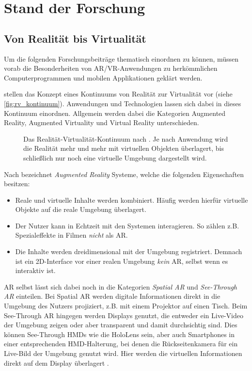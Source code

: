 \chapter{Stand der Forschung}
\label{chap:related_work}

\section{Von Realität bis Virtualität}
Um die folgenden Forschungsbeiträge thematisch einordnen zu können, müssen vorab die Besonderheiten von AR/VR-Anwendungen zu herkömmlichen Computerprogrammen und mobilen Applikationen geklärt werden.

\textcite{Milgram1994} stellen das Konzept eines Kontinuums von Realität zur Virtualität vor (siehe \autoref{fig:rv_kontinuum}).
Anwendungen und Technologien lassen sich dabei in dieses Kontinuum einordnen.
Allgemein werden dabei die Kategorien Augmented Reality, Augmented Virtuality und Virtual Reality unterschieden.
\begin{figure}[b]
    \centering
    \caption{Das Realität-Virtualität-Kontinuum nach \textcite{Milgram1994}. Je nach Anwendung wird die Realität mehr und mehr mit virtuellen Objekten überlagert, bis schließlich nur noch eine virtuelle Umgebung dargestellt wird.}
    \label{fig:rv_kontinuum}
\end{figure}
Nach \textcite{Azuma1997} bezeichnet \emph{Augmented Reality} Systeme, welche die folgenden Eigenschaften besitzen:
\begin{itemize}
    \item Reale und virtuelle Inhalte werden kombiniert. Häufig werden hierfür virtuelle Objekte auf die reale Umgebung überlagert.
    \item Der Nutzer kann in Echtzeit mit den Systemen interagieren. So zählen z.B. Spezialeffekte in Filmen \emph{nicht} als AR.
    \item Die Inhalte werden dreidimensional mit der Umgebung registriert. Demnach ist ein 2D-Interface vor einer realen Umgebung \emph{kein} AR, selbst wenn es interaktiv ist.
\end{itemize}
AR selbst lässt sich dabei noch in die Kategorien \emph{Spatial AR} und \emph{See-Through AR} einteilen.
Bei Spatial AR werden digitale Informationen direkt in die Umgebung des Nutzers projiziert, z.B. mit einem Projektor auf einen Tisch.
Beim See-Through AR hingegen werden Displays genutzt, die entweder ein Live-Video der Umgebung zeigen oder aber transparent und damit durchsichtig sind.
Dies können See-Through HMDs wie die HoloLens sein, aber auch Smartphones in einer entsprechenden HMD-Halterung, bei denen die Rückseitenkamera für ein Live-Bild der Umgebung genutzt wird.
Hier werden die virtuellen Informationen direkt auf dem Display überlagert \autocite{Zachmann2015}.

